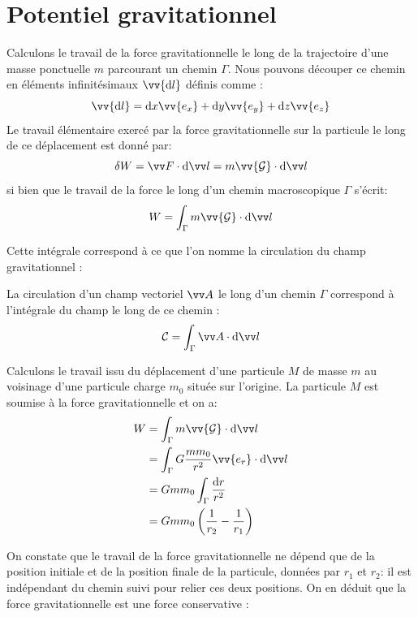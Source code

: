\documentclass[11pt,fleqn]{book} %
\begin{document}
\section{Potentiel gravitationnel}

Calculons le travail de la force gravitationnelle le long de la trajectoire d'une masse ponctuelle $m$ parcourant un chemin $\Gamma$. Nous pouvons découper ce chemin en éléments infinitésimaux $\vv{\mathrm{d} l}$ définis comme :
\begin{equation}
	\vv{\mathrm{d}l} = \mathrm{d}x \vv{e_x} + \mathrm{d}y \vv{e_y} + \mathrm{d}z \vv{e_z}
\end{equation}
Le travail élémentaire exercé par la force gravitationnelle sur la particule le long de ce déplacement est donné par:
\begin{equation}
    \delta W = \vv F \cdot \mathrm{d} \vv l = m \vv{\mathcal{G}} \cdot \mathrm{d} \vv l
\end{equation}
si bien que le travail de la force le long d'un chemin macroscopique $\Gamma$ s'écrit:
\begin{equation}
    W = \int_\Gamma  m \vv{\mathcal{G}} \cdot \mathrm{d} \vv l
\end{equation}

Cette intégrale correspond à ce que l'on nomme la circulation du champ gravitationnel :

\begin{definition}
    La circulation d'un champ vectoriel $\vv A$ le long d'un chemin $\Gamma$ correspond à l'intégrale du champ le long de ce chemin :
    \begin{equation}
        \mathcal{C} = \int_\Gamma \vv A \cdot \mathrm{d}\vv l
    \end{equation}
\end{definition}

\begin{example}
    Calculons le travail issu du déplacement d'une particule $M$ de masse $m$ au voisinage d'une particule charge $m_0$ située sur l'origine. La particule $M$ est soumise à la force gravitationnelle et on a:
    \begin{align}
        W &= \int_\Gamma  m \vv{\mathcal{G}} \cdot \mathrm{d} \vv l \\
        &= \int_\Gamma G \frac{m m_0}{r^2} \vv{e_r} \cdot \mathrm{d} \vv l\\
        &=  G m m_0 \int_\Gamma \frac{\mathrm{d}r}{r^2} \\
        &= G m m_0 \left(\frac{1}{r_2} - \frac{1}{r_1} \right)
    \end{align}
\end{example}
On constate que le travail de la force gravitationnelle ne dépend que de la position initiale et de la position finale de la particule, données par $r_1$ et $r_2$: il est indépendant du chemin suivi pour relier ces deux positions. On en déduit que la force gravitationnelle est une force conservative :
\end{document}
